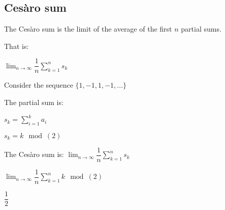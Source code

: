 
\subsection{Cesàro sum}

The Cesàro sum is the limit of the average of the first \(n\) partial sums.

That is:

\(\lim_{n\rightarrow \infty }\dfrac{1}{n}\sum_{k=1}^ns_k\)

Consider the sequence \(\{1,-1,1,-1,...\}\)

The partial sum is:

\(s_k=\sum_{i=1}^ka_i\)

\(s_k=k\mod(2)\)

The Cesàro sum is:
\(\lim_{n\rightarrow \infty }\dfrac{1}{n}\sum_{k=1}^ns_k\)

\(\lim_{n\rightarrow \infty }\dfrac{1}{n}\sum_{k=1}^nk\mod(2)\)

\(\dfrac{1}{2}\)


